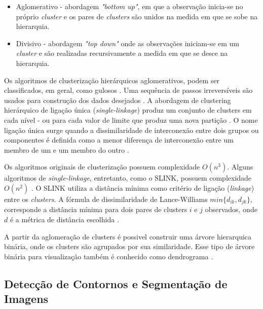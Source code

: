\begin{document}
\begin{itemize}
 \item Aglomerativo - abordagem \textit{"bottom up"}, em que a observação inicia-se no próprio \textit{cluster} e os pares de \textit{clusters} são unidos na medida em que se sobe na hierarquia. 
 \item Divisivo - abordagem \textit{"top down"} onde as observações iniciam-se em um \textit{cluster} e são realizadas recursivamente a medida em que se desce na hierarquia.
\end{itemize}

Os algoritmos de clusterização hierárquicos aglomerativos, podem ser classificados, em geral, como gulosos \cite{SINGLE_LINKAGE}. Uma sequência de passos irreversíveis são usados para construção dos dados desejados \cite{SINGLE_LINKAGE}. A abordagem de clustering hierárquico de ligação única (\textit{single-linkage}) produz um conjunto de clusters em cada nível - ou para cada valor de limite que produz uma nova partição \cite{SINGLE_LINKAGE}. O nome ligação única surge quando a dissimilaridade de interconexão entre dois grupos ou componentes é definida como a menor diferença de interconexão entre um membro de um e um membro do outro \cite{SINGLE_LINKAGE}.

Os algoritmos originais de clusterização possuem complexidade $O(n^3)$. Alguns algoritmos de \textit{single-linkage}, entretanto, como o SLINK, possuem complexidade $O(n^2)$ \cite{SLINK} \cite{SINGLE_LINKAGE}. O SLINK utiliza a distância mínima como critério de ligação (\textit{linkage}) entre os \textit{clusters}. A fórmula de dissimilaridade de Lance-Williams $min\{d_{ik}, d_{jk}\}$, corresponde a distância mínima para dois pares de clusters $i$ e $j$ observados, onde $d$ é a métrica de distância escolhida \cite{SINGLE_LINKAGE}.

A partir da aglomeração de clusters é possivel construir uma árvore hierarquica binária, onde os clusters são agrupados por sua similaridade. Esse tipo de árvore binária para visualização também é conhecido como dendrograma \cite{SINGLE_LINKAGE}.


\subsection{Detecção de Contornos e Segmentação de Imagens} \label{ssec:segmentacao}
\end{document}
